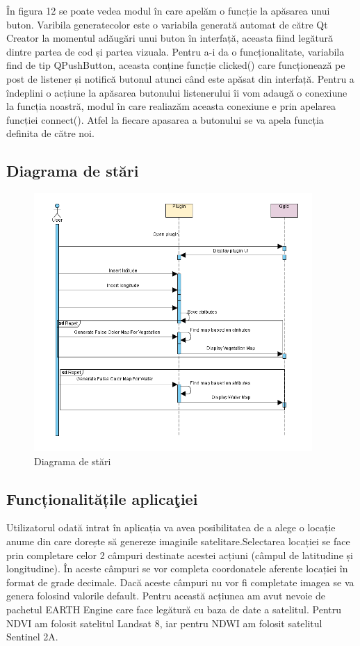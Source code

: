 \documentclass[12pt,a4paper]{article}
\theoremstyle{definition}
\theoremstyle{remark}
\begin{document}
  În figura 12 se poate vedea modul în care apelăm o funcție la apăsarea unui buton. Varibila generatecolor este o variabila generată automat de către Qt Creator la momentul adăugări unui buton în interfață, aceasta fiind legătură dintre partea de cod și partea vizuala. Pentru a-i da o funcționalitate, variabila find de tip QPushButton, aceasta conține funcție clicked() care funcționează pe post de listener și notifică butonul atunci când este apăsat din interfață. Pentru a îndeplini o acțiune la apăsarea butonului listenerului îi vom adaugă o conexiune la funcția noastră, modul în care realiazăm aceasta conexiune e prin apelarea funcției connect(). Atfel la fiecare apasarea a butonului se va apela funcția definita de către noi.

\subsection{Diagrama de stări}

\begin{figure}[H]
  \centering
  \includegraphics[width=300pt]{diagramastariPNG.PNG}
  \caption{Diagrama de stări}   
\end{figure}



\subsection{Funcționalitățile aplica\c tiei}

Utilizatorul odată intrat în aplicația va avea posibilitatea de a alege o locație anume din care dorește să genereze imaginile satelitare.Selectarea locației se face prin completare celor 2 câmpuri destinate acestei acțiuni (câmpul de latitudine și longitudine). În aceste câmpuri se vor completa coordonatele aferente locației în format de grade decimale. Dacă aceste câmpuri nu vor fi completate imagea se va genera folosind valorile default. Pentru această acțiunea am avut nevoie de pachetul EARTH Engine care face legătură cu baza de date a satelitul. Pentru NDVI am folosit satelitul Landsat 8, iar pentru NDWI am folosit satelitul Sentinel 2A. 
\end{document}
